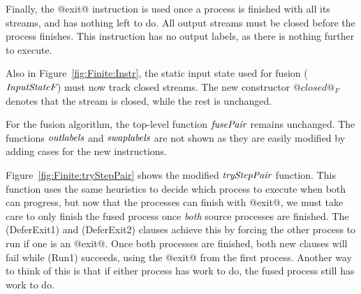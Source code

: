 Finally, the @exit@ instruction is used once a process is finished with all its streams, and has nothing left to do. All output streams must be closed before the process finishes. This instruction has no output labels, as there is nothing further to execute.

Also in Figure~\ref{fig:Finite:Instr}, the static input state used for fusion ($\textit{InputStateF}$) must now track closed streams. The new constructor $@closed@_F$ denotes that the stream is closed, while the rest is unchanged.

For the fusion algorithm, the top-level function $\textit{fusePair}$ remains unchanged. The functions $\textit{outlabels}$ and $\textit{swaplabels}$ are not shown as they are easily modified by adding cases for the new instructions.

Figure~\ref{fig:Finite:tryStepPair} shows the modified $\textit{tryStepPair}$ function. This function uses the same heuristics to decide which process to execute when both can progress, but now that the processes can finish with @exit@, we must take care to only finish the fused process once \emph{both} source processes are finished. The (DeferExit1) and (DeferExit2) clauses achieve this by forcing the other process to run if one is an @exit@. Once both processes are finished, both new clauses will fail while (Run1) succeeds, using the @exit@ from the first process. Another way to think of this is that if either process has work to do, the fused process still has work to do.

